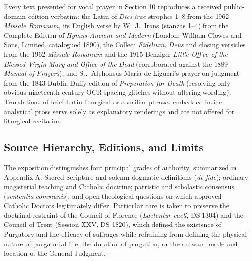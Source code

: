 Every text presented for vocal prayer in Section 10 reproduces a received public-domain edition verbatim: the Latin of \textit{Dies irae} strophes 1--8 from the 1962 \textit{Missale Romanum}, its English verse by W.\ J.\ Irons (stanzas 1--4) from the Complete Edition of \textit{Hymns Ancient and Modern} (London: William Clowes and Sons, Limited, catalogued 1890), the Collect \textit{Fidelium, Deus} and closing versicles from the 1962 \textit{Missale Romanum} and the 1915 Benziger \textit{Little Office of the Blessed Virgin Mary and Office of the Dead} (corroborated against the 1889 \textit{Manual of Prayers}), and St.\ Alphonsus Maria de Liguori's prayer on judgment from the 1843 Dublin Duffy edition of \textit{Preparation for Death} (resolving only obvious nineteenth-century OCR spacing glitches without altering wording). Translations of brief Latin liturgical or conciliar phrases embedded inside analytical prose serve solely as explanatory renderings and are not offered for liturgical recitation.

\subsection*{Source Hierarchy, Editions, and Limits}

The exposition distinguishes four principal grades of authority, summarized in Appendix A: Sacred Scripture and solemn dogmatic definitions (\textit{de fide}); ordinary magisterial teaching and Catholic doctrine; patristic and scholastic consensus (\textit{sententia communis}); and open theological questions on which approved Catholic Doctors legitimately differ. Particular care is taken to preserve the doctrinal restraint of the Council of Florence (\textit{Laetentur caeli}, DS 1304) and the Council of Trent (Session XXV, DS 1820), which defined the existence of Purgatory and the efficacy of suffrages while refraining from defining the physical nature of purgatorial fire, the duration of purgation, or the outward mode and location of the General Judgment.

